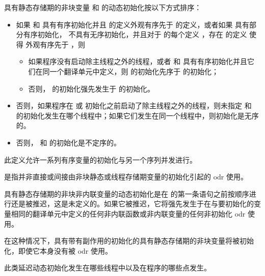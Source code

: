 \pnum
具有静态存储期的非块变量  和  的动态初始化按以下方式排序：
\begin{itemize}
\item
如果  和  具有有序初始化并且  的定义外观有序先于  的定义，或者如果  具有部分有序初始化， 不具有无序初始化，并且对于  的每个定义 ，存在  的定义  使得  外观有序先于 ，则
\begin{itemize}
\item
如果程序没有启动除主线程之外的线程，或者  和  具有有序初始化并且它们在同一个翻译单元中定义，则  的初始化先序于  的初始化；
\item
否则， 的初始化强先发生于  的初始化。
\end{itemize}

\item
否则，如果程序在  或  初始化之前启动了除主线程之外的线程，则未指定  和  的初始化发生在哪个线程中；如果它们发生在同一个线程中，则初始化是无序的。

\item
否则， 和  的初始化是不定序的。
\end{itemize}
\begin{note}
此定义允许一系列有序变量的初始化与另一个序列并发进行。
\end{note}

\pnum
{}%
 是指并非直接或间接由非块静态或线程存储期变量的初始化引起的 odr 使用。


\pnum
{}%
具有静态存储期的非块非内联变量的动态初始化是在  的第一条语句之前按顺序进行还是被推迟，这是未定义的。如果它被推迟，它将强先发生于在与要初始化的变量相同的翻译单元中定义的任何非内联函数或非内联变量的任何非初始化 odr 使用。
\begin{footnote}
在这种情况下，具有带有副作用的初始化的具有静态存储期的非块变量将被初始化，即使它本身没有被 odr 使用。
\end{footnote}
此类延迟动态初始化发生在哪些线程中以及在程序的哪些点发生。

